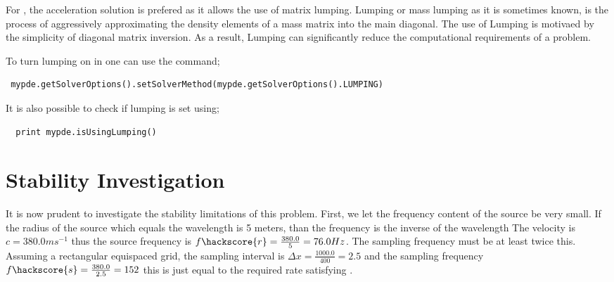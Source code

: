 For \esc, the acceleration solution is prefered as it allows the use of matrix
lumping. Lumping or mass lumping as it is sometimes known, is the process of
aggressively approximating the density elements of a mass matrix into the main
diagonal. The use of Lumping is motivaed by the simplicity of diagonal matrix
 inversion. As a result, Lumping can significantly reduce the computational
requirements of a problem.

To turn lumping on in \esc one can use the command;
\begin{verbatim}
 mypde.getSolverOptions().setSolverMethod(mypde.getSolverOptions().LUMPING)
\end{verbatim}
It is also possible to check if lumping is set using;
\begin{verbatim}
  print mypde.isUsingLumping()
\end{verbatim}

\section{Stability Investigation}
It is now prudent to investigate the stability limitations of this problem.
First, we let the frequency content of the source be very small. If the radius
of the source which equals the wavelength is 5 meters, than the frequency is
the inverse of the wavelength  The velocity is $c=380.0ms^{-1}$ thus the source
frequency is $f\hackscore{r} = \frac{380.0}{5} = 76.0 Hz$. The sampling
frequency must be at least twice this. Assuming a rectangular equispaced grid,
the sampling interval is $\Delta x = \frac{1000.0}{400} = 2.5$ and the sampling
frequency $f\hackscore{s}=\frac{380.0}{2.5}=152$ this is just equal to the
required rate satisfying . 




